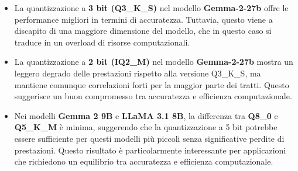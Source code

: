 \begin{itemize}
    \item La quantizzazione a \textbf{3 bit (Q3\_K\_S)} nel modello \textbf{Gemma-2-27b} offre le performance migliori in termini di accuratezza. Tuttavia, questo viene a discapito di una maggiore dimensione del modello, che in questo caso si traduce in un overload di risorse computazionali.

    \item La quantizzazione a \textbf{2 bit (IQ2\_M)} nel modello \textbf{Gemma-2-27b} mostra un leggero degrado delle prestazioni rispetto alla versione Q3\_K\_S, ma mantiene comunque correlazioni forti per la maggior parte dei tratti. Questo suggerisce un buon compromesso tra accuratezza e efficienza computazionale.

    \item Nei modelli \textbf{Gemma 2 9B} e \textbf{LLaMA 3.1 8B}, la differenza tra \textbf{Q8\_0} e \textbf{Q5\_K\_M} è minima, suggerendo che la quantizzazione a 5 bit potrebbe essere sufficiente per questi modelli più piccoli senza significative perdite di prestazioni. Questo risultato è particolarmente interessante per applicazioni che richiedono un equilibrio tra accuratezza e efficienza computazionale.
\end{itemize}
